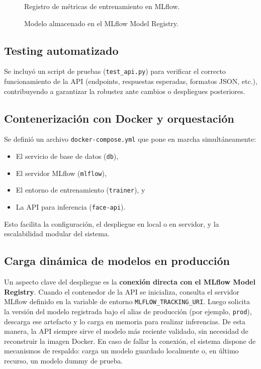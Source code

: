 \begin{figure}[h]
\centering
\caption{Registro de métricas de entrenamiento en MLflow.}
\label{fig:mlflow-metrics}
\end{figure}

\begin{figure}[h]
\centering
\caption{Modelo almacenado en el MLflow Model Registry.}
\label{fig:mlflow-model}
\end{figure}

\subsection{Testing automatizado}
Se incluyó un script de pruebas (\texttt{test\_api.py}) para verificar el correcto funcionamiento de la API (endpoints, respuestas esperadas, formatos JSON, etc.), contribuyendo a garantizar la robustez ante cambios o despliegues posteriores.

\subsection{Contenerización con Docker y orquestación}
Se definió un archivo \texttt{docker-compose.yml} que pone en marcha simultáneamente:
\begin{itemize}
  \item El servicio de base de datos (\texttt{db}),
  \item El servidor MLflow (\texttt{mlflow}),
  \item El entorno de entrenamiento (\texttt{trainer}), y
  \item La API para inferencia (\texttt{face-api}).
\end{itemize}
Esto facilita la configuración, el despliegue en local o en servidor, y la escalabilidad modular del sistema.

\subsection{Carga dinámica de modelos en producción}
Un aspecto clave del despliegue es la \textbf{conexión directa con el MLflow Model Registry}. 
Cuando el contenedor de la API se inicializa, consulta el servidor MLflow definido en la variable de entorno \texttt{MLFLOW\_TRACKING\_URI}. 
Luego solicita la versión del modelo registrada bajo el alias de producción (por ejemplo, \texttt{prod}), descarga ese artefacto y lo carga en memoria para realizar inferencias. 
De esta manera, la API siempre sirve el modelo más reciente validado, sin necesidad de reconstruir la imagen Docker. 
En caso de fallar la conexión, el sistema dispone de mecanismos de respaldo: carga un modelo guardado localmente o, en último recurso, un modelo dummy de prueba.


